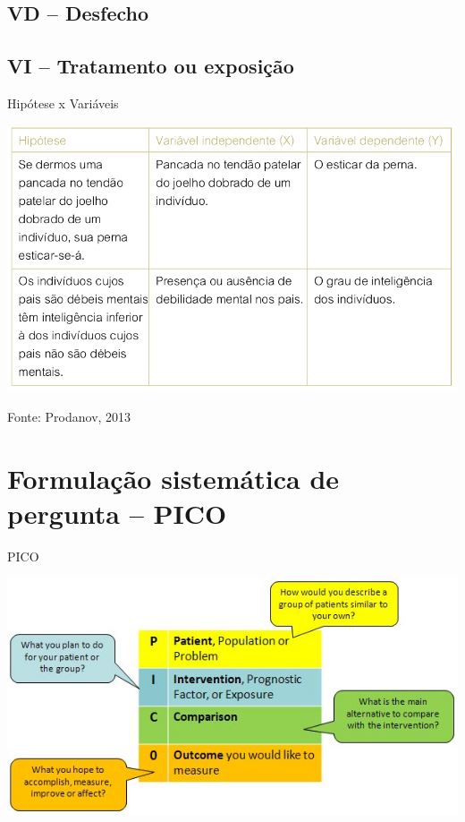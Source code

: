 \documentclass{beamer}
\begin{document}
\subsection{VD -- Desfecho}

\subsection{VI -- Tratamento ou exposição}

\begin{frame}{Hipótese x Variáveis}
  \begin{center}
  \includegraphics[height=0.8\textheight]{Hipoteses_variaveis/hipotese_variaveis}
\end{center}

  \vfill
  \scriptsize
  \hfill Fonte: Prodanov, 2013
\end{frame}

\section{Formulação sistemática de pergunta -- PICO}

\begin{frame}{PICO}
  \begin{center}
    \includegraphics[height=0.8\textheight]{Hipoteses_variaveis/pico}
  \end{center}
\end{frame}
\end{document}
